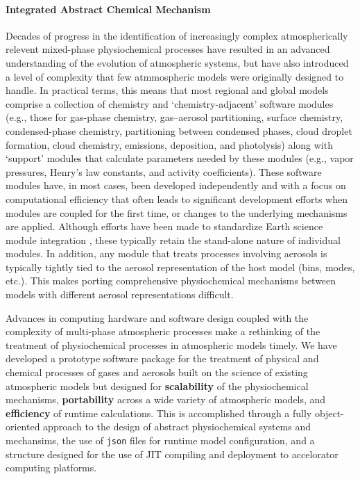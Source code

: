 \documentclass[11pt]{article}
\begin{document}
\paragraph{Integrated Abstract Chemical Mechanism}
Decades of progress in the identification of increasingly complex
atmospherically relevent mixed-phase physiochemical processes have resulted
in an advanced understanding of the evolution of atmospheric systems, but
have also introduced a level of complexity that few atmmospheric models were
originally designed to handle. In practical terms, this means that most
regional and global models comprise a collection of chemistry and
`chemistry-adjacent' software modules (e.g., those for gas-phase chemistry,
gas--aerosol partitioning, surface chemistry, condensed-phase chemistry,
partitioning between condensed phases, cloud droplet formation, cloud
chemistry, emissions, deposition, and photolysis)
along with `support' modules that calculate parameters needed by these
modules (e.g., vapor pressures, Henry's law constants, and activity
coefficients).
These software modules have, in most cases, been developed independently and
with a focus on computational efficiency that often leads to significant
development efforts when modules are coupled for the first time,
or changes to the underlying mechanisms are applied.
Although efforts have been made to standardize Earth
science module integration \citep{jockel2005}, these typically
retain the stand-alone nature of individual modules.
In addition, any module that treats processes
involving aerosols is typically tightly tied to the aerosol representation
of the host model (bins, modes, etc.). This makes porting comprehensive
physiochemical mechanisms between models with different aerosol
representations difficult.

Advances in computing hardware and software design coupled with the
complexity of multi-phase atmospheric processes make a rethinking of
the treatment of physiochemical processes in atmospheric models timely.
We have developed a prototype software package for the treatment of
physical and chemical processes of gases and aerosols built on the science
of existing atmospheric models but designed for
{\bf scalability} of the physiochemical mechanisms, {\bf portability} across
a wide variety of atmospheric models, and {\bf efficiency} of runtime
calculations. This is accomplished through a fully object-oriented approach
to the design of abstract physiochemical systems and mechansims, the use of
\texttt{json} files for runtime model configuration, and a structure
designed for the use of JIT compiling and deployment to accelorator
computing platforms.
\end{document}
